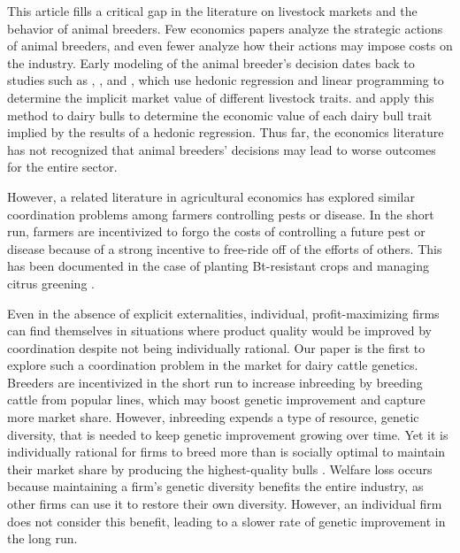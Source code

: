 \documentclass[12pt,letterpaper]{article}
\begin{document}
This article fills a critical gap in the literature on livestock markets and the behavior of animal breeders.
Few economics papers analyze the strategic actions of animal breeders, and even fewer analyze how their actions may impose costs on the industry.
Early modeling of the animal breeder's decision dates back to studies such as \citet{ladd1978}, \citet{Kerr1984}, and \citet{Melton1994}, which use hedonic regression and linear programming to determine the implicit market value of different livestock traits.
\citet{Richards1996} and \citet{Schroeder1992} apply this method to dairy bulls to determine the economic value of each dairy bull trait implied by the results of a hedonic regression.
Thus far, the economics literature has not recognized that animal breeders' decisions may lead to worse outcomes for the entire sector.

However, a related literature in agricultural economics has explored similar coordination problems among farmers controlling pests or disease.
In the short run, farmers are incentivized to forgo the costs of controlling a future pest or disease because of a strong incentive to free-ride off of the efforts of others.
This has been documented in the case of planting Bt-resistant crops \citep{epanchin2015individual,brown2018voluntary,wechsler2018has,livingston2004managing} and managing citrus greening \citet{lence2023does}. 

Even in the absence of explicit externalities, individual, profit-maximizing firms can find themselves in situations where product quality would be improved by coordination despite not being individually rational.
Our paper is the first to explore such a coordination problem in the market for dairy cattle genetics.
Breeders are incentivized in the short run to increase inbreeding by breeding cattle from popular lines, which may boost genetic improvement and capture more market share.
However, inbreeding expends a type of resource, genetic diversity, that is needed to keep genetic improvement growing over time.
Yet it is individually rational for firms to breed more than is socially optimal to maintain their market share by producing the highest-quality bulls \citep{Cole2019}.
Welfare loss occurs because maintaining a firm's genetic diversity benefits the entire industry, as other firms can use it to restore their own diversity.
However, an individual firm does not consider this benefit, leading to a slower rate of genetic improvement in the long run.

\end{document}
